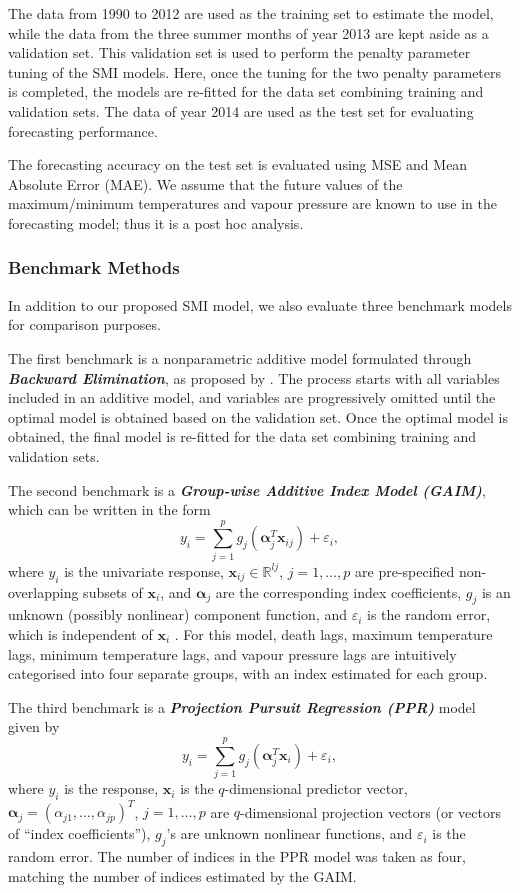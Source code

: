 \documentclass[
  11pt,
  a4paper,
]{article}
\begin{document}
The data from 1990 to 2012 are used as the training set to estimate the
model, while the data from the three summer months of year 2013 are kept
aside as a validation set. This validation set is used to perform the
penalty parameter tuning of the SMI models. Here, once the tuning for
the two penalty parameters is completed, the models are re-fitted for
the data set combining training and validation sets. The data of year
2014 are used as the test set for evaluating forecasting performance.

The forecasting accuracy on the test set is evaluated using MSE and Mean
Absolute Error (MAE). We assume that the future values of the
maximum/minimum temperatures and vapour pressure are known to use in the
forecasting model; thus it is a post hoc analysis.

\subsubsection{Benchmark Methods}\label{sec-benchmark}

In addition to our proposed SMI model, we also evaluate three benchmark
models for comparison purposes.

The first benchmark is a nonparametric additive model formulated through
\textbf{\emph{Backward Elimination}}, as proposed by \textcite{FH2012}.
The process starts with all variables included in an additive model, and
variables are progressively omitted until the optimal model is obtained
based on the validation set. Once the optimal model is obtained, the
final model is re-fitted for the data set combining training and
validation sets.

The second benchmark is a \textbf{\emph{Group-wise Additive Index Model
(GAIM)}}, which can be written in the form \[
  y_{i} = \sum_{j = 1}^{p} g_{j}(\bm{\alpha}_{j}^{T}\bm{x}_{ij}) + \varepsilon_{i},
\] where \(y_{i}\) is the univariate response,
\(\bm{x}_{ij} \in \mathbb{R}^{l{j}}\), \(j = 1, \dots, p\) are
pre-specified non-overlapping subsets of \(\bm{x}_{i}\), and
\(\bm{\alpha}_j\) are the corresponding index coefficients, \(g_{j}\) is
an unknown (possibly nonlinear) component function, and
\(\varepsilon_{i}\) is the random error, which is independent of
\(\bm{x}_{i}\) \autocite{Wang2015,Masselot2022}. For this model, death
lags, maximum temperature lags, minimum temperature lags, and vapour
pressure lags are intuitively categorised into four separate groups,
with an index estimated for each group.

The third benchmark is a \textbf{\emph{Projection Pursuit Regression
(PPR)}} model \autocite{Friedman1981} given by \[
  y_{i} = \sum_{j=1}^{p} {g_{j}(\bm{\alpha}_{j}^{T}\bm{x}_{i})} + \varepsilon_{i},
\] where \(y_{i}\) is the response, \(\bm{x}_{i}\) is the
\(q\)-dimensional predictor vector,
\(\bm{\alpha}_{j} = ( \alpha_{j1}, \dots, \alpha_{jp} )^{T}\),
\(j = 1, \dots, p\) are \(q\)-dimensional projection vectors (or vectors
of ``index coefficients''), \(g_{j}\)'s are unknown nonlinear functions,
and \(\varepsilon_{i}\) is the random error. The number of indices in
the PPR model was taken as four, matching the number of indices
estimated by the GAIM.
\end{document}
